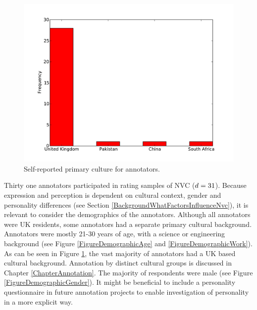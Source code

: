 \begin{figure}[tb]
\centering
\includegraphics[width = 0.5 \columnwidth]{corpus/demographicLocation.pdf}
\caption{Self-reported primary culture for annotators.}
\label{FigureDemographicLocation}
\end{figure}

Thirty one annotators participated in rating samples of \ac{NVC} ($d = 31$). Because expression and perception is dependent on cultural context, gender and personality differences (see Section \ref{BackgroundWhatFactorsInfluenceNvc}), it is relevant to consider the demographics of the annotators. Although all annotators were UK residents, some annotators had a separate primary cultural background. Annotators were mostly 21-30 years of age, with a science or engineering background (see Figure \ref{FigureDemographicAge} and \ref{FigureDemographicWork}). As can be seen in Figure \ref{FigureDemographicLocation}, the vast majority of annotators had a UK based cultural background. 
Annotation by distinct cultural groups is discussed in Chapter \ref{ChapterAnnotation}. The majority of respondents were male (see Figure \ref{FigureDemographicGender}). 
It might be beneficial to include a personality questionnaire in future annotation projects to enable investigation of personality in a more explicit way. %

